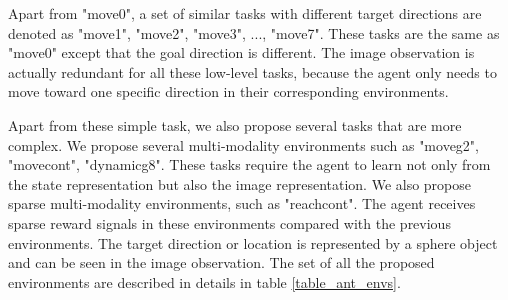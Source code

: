 Apart from "move0", a set of similar tasks with different target directions are denoted as "move1", "move2", "move3", ..., "move7". These tasks are the same as "move0" except that the goal direction is different. The image observation is actually redundant for all these low-level tasks, because the agent only needs to move toward one specific direction in their corresponding environments.

Apart from these simple task, we also propose several tasks that are more complex. We propose several multi-modality environments such as "moveg2", "movecont", "dynamicg8". These tasks require the agent to learn not only from the state representation but also the image representation. We also propose sparse multi-modality environments, such as "reachcont". The agent receives sparse reward signals in these environments compared with the previous environments. The target direction or location is represented by a sphere object and can be seen in the image observation.
The set of all the proposed environments are described in details in table \ref{table_ant_envs}.


